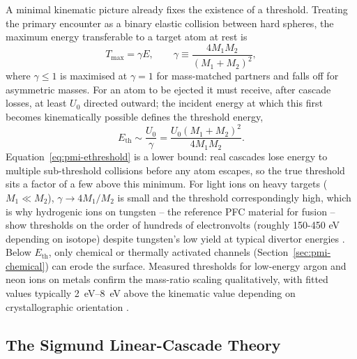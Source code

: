 A minimal kinematic picture already fixes the existence of a threshold. Treating the primary encounter as a binary elastic collision between hard spheres, the maximum energy transferable to a target atom at rest is
\begin{equation}
T_{\max} = \gamma E, \qquad \gamma \equiv \frac{4 M_1 M_2}{(M_1+M_2)^2},
\label{eq:pmi-gamma}
\end{equation}
where $\gamma \le 1$ is maximised at $\gamma=1$ for mass-matched partners and falls off for asymmetric masses. For an atom to be ejected it must receive, after cascade losses, at least $U_0$ directed outward; the incident energy at which this first becomes kinematically possible defines the threshold energy,
\begin{equation}
E_{\mathrm{th}} \sim \frac{U_0}{\gamma} = \frac{U_0 (M_1+M_2)^2}{4 M_1 M_2}.
\label{eq:pmi-ethreshold}
\end{equation}
Equation~\eqref{eq:pmi-ethreshold} is a lower bound: real cascades lose energy to multiple sub-threshold collisions before any atom escapes, so the true threshold sits a factor of a few above this minimum. For light ions on heavy targets ($M_1 \ll M_2$), $\gamma \to 4M_1/M_2$ is small and the threshold correspondingly high, which is why hydrogenic ions on tungsten -- the reference PFC material for fusion -- show thresholds on the order of hundreds of electronvolts (roughly 150-450 eV depending on isotope) despite tungsten's low yield at typical divertor energies \cite{ref0158,ref0189}. Below $E_{\mathrm{th}}$, only chemical or thermally activated channels (Section~\ref{sec:pmi-chemical}) can erode the surface. Measured thresholds for low-energy argon and neon ions on metals confirm the mass-ratio scaling qualitatively, with fitted values typically \SIrange{2}{8}{\electronvolt} above the kinematic value depending on crystallographic orientation \cite{ref0152}.

\subsection{The Sigmund Linear-Cascade Theory}

